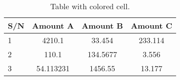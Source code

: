 \documentclass{article}
\begin{document}
  	\begin{table}[h!]
  		\begin{center}
  			\caption{Table with colored cell.}
  			\label{tab:table1}
  			\begin{tabular}{|l|S|c|c|}
  				\hline
  				\textbf{S/N} & \textbf{Amount A} & \textbf{Amount B} &\textbf{Amount C}\\
  				\hline
  				1 & 4210.1 & 33.454 & 233.114\\
  				2 & 110.1 & 134.5677 & 3.556\\
  				3 & 54.113231 & 1456.55 & 13.177\\
  				\hline
  			\end{tabular}
  		\end{center}
  	\end{table}
 
  
\end{document}
